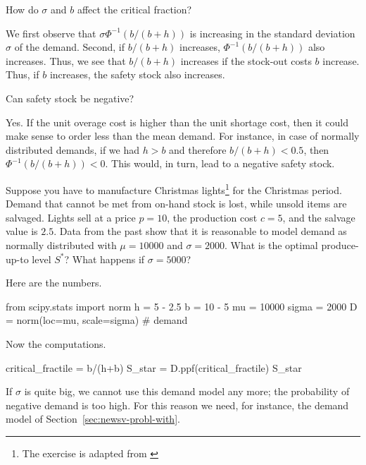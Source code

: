 \begin{exercise}
How do $\sigma$ and $b$ affect the critical fraction?
\begin{solution}
We first observe that $\sigma \Phi^{-1}(b/(b+h))$ is increasing in the standard deviation $\sigma$ of the demand.  Second, if $b/(b+h)$ increases, $\Phi^{-1}(b/(b+h))$ also increases. Thus, we see that $b/(b+h)$ increases if the stock-out costs $b$ increase. Thus, if $b$ increases, the safety stock also increases.
\end{solution}
\end{exercise}

\begin{exercise}
Can safety stock be negative?


\begin{solution}
Yes. If the unit overage cost is higher than the unit shortage cost, then it could make sense to order less than the mean demand. For instance, in case of normally distributed demands, if we had $h>b$ and therefore $b/(b+h)<0.5$, then $\Phi^{-1}(b/(b+h))<0$. This would, in turn, lead to a negative safety stock. 
\end{solution}
\end{exercise}

\begin{exercise} Suppose you have to manufacture Christmas lights\footnote{The exercise is adapted from \cite{hopp08:_factor_physic}} for the Christmas period. Demand that cannot be met from on-hand stock is lost, while unsold items are salvaged. Lights sell at a price  $p=10$, the production cost $c=5$, and the salvage value is $2.5$. Data from the past show that it is reasonable to model demand as normally distributed with $\mu=10 000$ and $\sigma=2 000$. What is the optimal produce-up-to level $S^*$? What happens if $\sigma = 5 000$?

\begin{solution}
Here are the numbers.
\begin{pyconsole}[christmas]
from scipy.stats import norm
h = 5 - 2.5  
b = 10 - 5
mu = 10000
sigma = 2000
D = norm(loc=mu, scale=sigma) # demand
\end{pyconsole}

Now the computations.
\begin{pyconsole}[christmas]
critical_fractile = b/(h+b)
S_star = D.ppf(critical_fractile)
S_star
\end{pyconsole}

If $\sigma$ is quite big, we cannot use this demand model any more; the probability of negative demand is too high. For this reason we need, for instance, the demand model of Section~\ref{sec:newsv-probl-with}. 
\end{solution}
\end{exercise}

